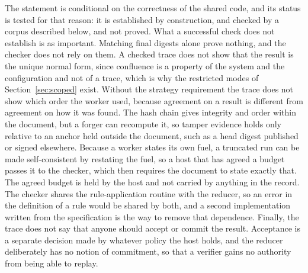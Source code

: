 \documentclass[11pt]{article}
\theoremstyle{definition}
\theoremstyle{remark}
\begin{document}
The statement is conditional on the correctness of the shared code, and its status is tested for that reason: it is established by construction, and checked by a corpus described below, and not proved. What a successful check does not establish is as important. Matching final digests alone prove nothing, and the checker does not rely on them. A checked trace does not show that the result is the unique normal form, since confluence is a property of the system and the configuration and not of a trace, which is why the restricted modes of Section~\ref{sec:scoped} exist. Without the strategy requirement the trace does not show which order the worker used, because agreement on a result is different from agreement on how it was found. The hash chain gives integrity and order within the document, but a forger can recompute it, so tamper evidence holds only relative to an anchor held outside the document, such as a head digest published or signed elsewhere. Because a worker states its own fuel, a truncated run can be made self-consistent by restating the fuel, so a host that has agreed a budget passes it to the checker, which then requires the document to state exactly that. The agreed budget is held by the host and not carried by anything in the record. The checker shares the rule-application routine with the reducer, so an error in the definition of a rule would be shared by both, and a second implementation written from the specification is the way to remove that dependence. Finally, the trace does not say that anyone should accept or commit the result. Acceptance is a separate decision made by whatever policy the host holds, and the reducer deliberately has no notion of commitment, so that a verifier gains no authority from being able to replay.
\end{document}
